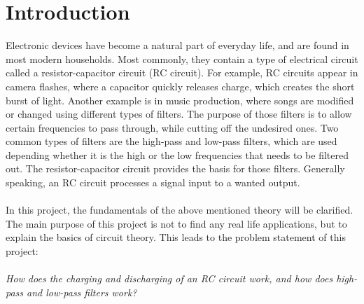 \chapter{Introduction}
Electronic devices have become a natural part of everyday life, and are found in most modern households. Most commonly, they contain a type of electrical circuit called a resistor-capacitor circuit (RC circuit). For example, RC circuits appear in camera flashes, where a capacitor quickly releases charge, which creates the short burst of light. Another example is in music production, where songs are modified or changed using different types of filters. The purpose of those filters is to allow certain frequencies to pass through, while cutting off the undesired ones. Two common types of filters are the high-pass and low-pass filters, which are used depending whether it is the high or the low frequencies that needs to be filtered out. The resistor-capacitor circuit provides the basis for those filters. Generally speaking, an RC circuit processes a signal input to a wanted output. 
\\ \\
In this project, the fundamentals of the above mentioned theory will be clarified. The main purpose of this project is not to find any real life applications, but to explain the basics of circuit theory. This leads to the problem statement of this project:
\\ \\
\textit{How does the charging and discharging of an RC circuit work, and how does high-pass and low-pass filters work?}

